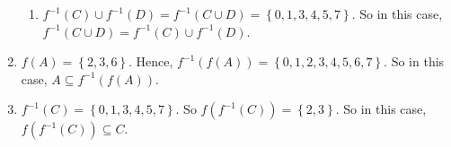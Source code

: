 \begin{enumerate}
\begin{enumerate}
\item
$f^{-1} ( C ) \cup f^{-1} ( D ) = 
f^{-1} ( C \cup D ) = \left\{ 0, 1, 3, 4, 5, 7 \right\}$.
So in this case, 
$f^{-1} ( C \cup D ) = f^{-1} ( C ) \cup f^{-1} ( D )$.
\end{enumerate}


\item $f ( A ) = \left\{ 2, 3, 6 \right\}$.  Hence, 
$f^{-1} \!\left( f ( A ) \right) = \left\{ 0, 1, 2, 3, 4, 5, 6, 7 \right\}$.  So in this case, 
$A \subseteq f^{-1} \!\left( f ( A ) \right)$.

\item $f^{-1} ( C ) = \left\{ 0, 1, 3, 4, 5, 7 \right\}$.  So 
$f \!\left( f^{-1} ( C ) \right) = \left\{2, 3 \right\}$.  So in this case, 
$f \!\left( f^{-1} ( C ) \right) \subseteq C$.
\end{enumerate}

\hbreak


\endinput


